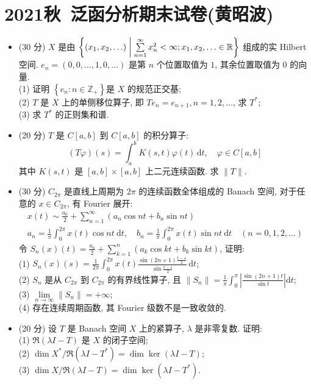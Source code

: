 \section{2021秋\ 泛函分析期末试卷(黄昭波)}
\begin{itemize}
\item[一](30 分) $X$ 是由 $\left\{(x_1, x_2, \ldots) \biggm| \sum\limits_{n=1}^{\infty} x_n^2<\infty ; x_1, x_2, \ldots \in \mathbb{R}\right\}$ 组成的实 Hilbert 空间. 
$e_n=(0,0, \ldots, 1,0, \ldots)$ 是第 $n$ 个位置取值为 $1$, 其余位置取值为 $0$ 的向量.\\
(1) 证明 $\left\{e_n: n \in \mathbb{Z}_{+}\right\}$是 $X$ 的规范正交基;\\
(2) $T$ 是 $X$ 上的单侧移位算子, 即 $T e_n=e_{n+1}, n=1,2, \ldots$, 求 $T^*$;\\
(3) 求 $T^*$ 的正则集和谱.

\item[二](20 分) $T$ 是 $C[a, b]$ 到 $C[a, b]$ 的积分算子:
$$
(T \varphi)(s)=\int_a^b K(s, t) \varphi(t) \,\mathrm{d} t, \quad \varphi \in C[a, b]
$$
其中 $K(s, t)$ 是 $[a, b] \times[a, b]$ 上二元连续函数. 求 $\|T\|$.

\item[三](30 分) $C_{2 \pi}$ 是直线上周期为 $2 \pi$ 的连续函数全体组成的 Banach 空间, 
对于任意的 $x \in C_{2 \pi}$, 有 Fourier 展开:
$$
\begin{gathered}
x(t) \sim \frac{a_0}{2}+\sum_{n=1}^{\infty}\left(a_n \cos n t+b_n \sin n t\right) \\
a_n=\frac{1}{\pi} \int_0^{2 \pi} x(t) \cos n t \mathrm{~d} t, \quad b_n=\frac{1}{\pi} \int_0^{2 \pi} x(t) \sin n t \mathrm{~d} t \quad(n=0,1,2, \ldots)
\end{gathered}
$$
令 $\displaystyle S_n(x)(t)=\frac{a_0}{2}+\sum_{k=1}^n\left(a_k \cos k t+b_k \sin k t\right)$, 证明:\\
(1) $\displaystyle S_n(x)(s)=\frac{1}{2 \pi} \int_0^{2 \pi} x(t) \frac{\sin (2 n+1) \frac{t-s}{2}}{\sin \frac{t-s}{2}} \,\mathrm{d} t$;\\
(2) $S_n$ 是从 $C_{2 \pi}$ 到 $C_{2 \pi}$ 的有界线性算子, 
且 $\displaystyle \left\|S_n\right\|=\frac{1}{\pi} \int_0^\pi\left|\frac{\sin (2 n+1) t}{\sin t}\right| \mathrm{d} t$;\\
(3) $\lim\limits_{n \rightarrow \infty}\left\|S_n\right\|=+\infty$;\\
(4) 存在连续周期函数, 其 Fourier 级数不是一致收敛的.

\item[四](20 分) 设 $T$ 是 Banach 空间 $X$ 上的紧算子, $\lambda$ 是非零复数. 证明:\\
(1) $\mathfrak{R}(\lambda I-T)$ 是 $X$ 的闭子空间;\\
(2) $\dim X^* / \mathfrak{R}(\lambda I-T^*)=\dim \ker(\lambda I-T)$;\\
(3) $\dim X / \mathfrak{R}(\lambda I-T)=\dim \ker(\lambda I-T^*)$.
\end{itemize}

